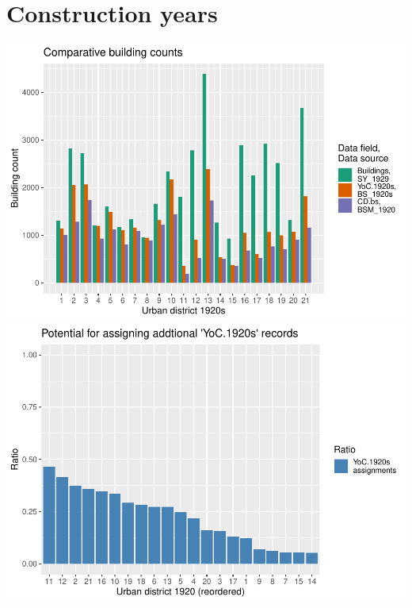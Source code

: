 \documentclass[
]{article}
\begin{document}
\hypertarget{construction-years}{%
\section{Construction years}\label{construction-years}}

\includegraphics{Usage_code_files/figure-latex/unnamed-chunk-14-1.pdf}
\includegraphics{Usage_code_files/figure-latex/unnamed-chunk-14-2.pdf}
\end{document}
